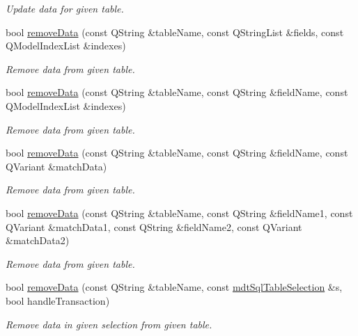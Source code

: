 \begin{DoxyCompactItemize}
\begin{DoxyCompactList}\small\item\em Update data for given table. \end{DoxyCompactList}\item 
bool \hyperlink{classmdt_tt_base_a7b328098b5813497aedfb764a1ff787f}{remove\-Data} (const Q\-String \&table\-Name, const Q\-String\-List \&fields, const Q\-Model\-Index\-List \&indexes)
\begin{DoxyCompactList}\small\item\em Remove data from given table. \end{DoxyCompactList}\item 
bool \hyperlink{classmdt_tt_base_a496e6e995a6bc4e72cade216520898e9}{remove\-Data} (const Q\-String \&table\-Name, const Q\-String \&field\-Name, const Q\-Model\-Index\-List \&indexes)
\begin{DoxyCompactList}\small\item\em Remove data from given table. \end{DoxyCompactList}\item 
bool \hyperlink{classmdt_tt_base_aefe84f30c646a4f53b42fcc102a1126d}{remove\-Data} (const Q\-String \&table\-Name, const Q\-String \&field\-Name, const Q\-Variant \&match\-Data)
\begin{DoxyCompactList}\small\item\em Remove data from given table. \end{DoxyCompactList}\item 
bool \hyperlink{classmdt_tt_base_ae301ec4f49781e9b649a1e49368838a5}{remove\-Data} (const Q\-String \&table\-Name, const Q\-String \&field\-Name1, const Q\-Variant \&match\-Data1, const Q\-String \&field\-Name2, const Q\-Variant \&match\-Data2)
\begin{DoxyCompactList}\small\item\em Remove data from given table. \end{DoxyCompactList}\item 
bool \hyperlink{classmdt_tt_base_a372e33909ae2912e3b69c67d05940910}{remove\-Data} (const Q\-String \&table\-Name, const \hyperlink{classmdt_sql_table_selection}{mdt\-Sql\-Table\-Selection} \&s, bool handle\-Transaction)
\begin{DoxyCompactList}\small\item\em Remove data in given selection from given table. \end{DoxyCompactList}\end{DoxyCompactItemize}
